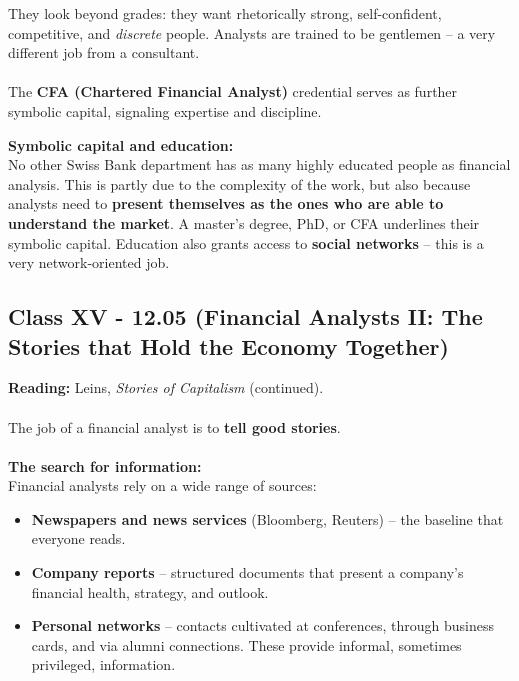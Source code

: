 \documentclass[a4paper,12pt]{article}
\begin{document}
\noindent They look beyond grades: they want rhetorically strong, self-confident, competitive, and \emph{discrete} people. Analysts are trained to be gentlemen -- a very different job from a consultant. \\
\\
\noindent The \textbf{CFA (Chartered Financial Analyst)} credential serves as further symbolic capital, signaling expertise and discipline.

\noindent \textbf{Symbolic capital and education:} \\
\noindent No other Swiss Bank department has as many highly educated people as financial analysis. This is partly due to the complexity of the work, but also because analysts need to \textbf{present themselves as the ones who are able to understand the market}. A master's degree, PhD, or CFA underlines their symbolic capital. Education also grants access to \textbf{social networks} -- this is a very network-oriented job. \\

\subsection*{Class XV - 12.05 (Financial Analysts II: The Stories that Hold the Economy Together)}
\noindent \textbf{Reading:} Leins, \emph{Stories of Capitalism} (continued). \\
\\
\noindent The job of a financial analyst is to \textbf{tell good stories}. \\
\\
\noindent \textbf{The search for information:} \\
\noindent Financial analysts rely on a wide range of sources:
\begin{itemize}
	\item \textbf{Newspapers and news services} (Bloomberg, Reuters) -- the baseline that everyone reads.
	\item \textbf{Company reports} -- structured documents that present a company's financial health, strategy, and outlook.
	\item \textbf{Personal networks} -- contacts cultivated at conferences, through business cards, and via alumni connections. These provide informal, sometimes privileged, information.
\end{itemize}
\end{document}

